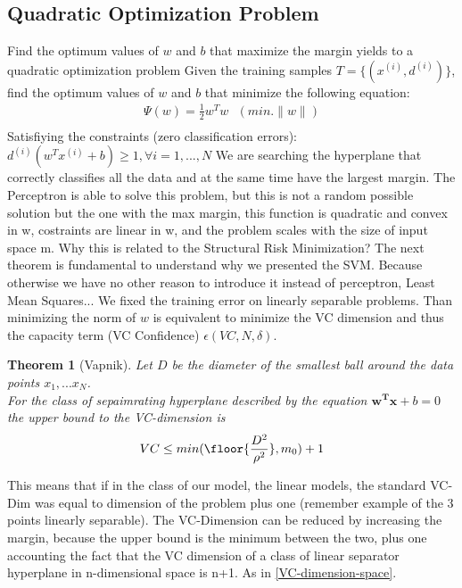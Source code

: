 \documentclass[12pt]{book}
\newtheorem{theorem}{Theorem}
\begin{document}
\subsection{Quadratic Optimization Problem}
Find the optimum values of $w$ and $b$ that maximize the margin yields to a quadratic optimization problem\newline
Given the training samples $T = \{(x^{(i)}, d^{(i)})\}$, find the optimum values of $w$ and $b$ that minimize the following equation:
\begin{equation}
\begin{aligned}
	\Psi(w)=\frac{1}{2}w^Tw \ \ \  (min.\|w\|) \\
\end{aligned}
\end{equation}
Satisfiying the constraints (zero classification errors): $d^{(i)}(w^Tx^{(i)} + b) \geq 1, \forall i = 1,...,N$
\newline\newline
We are searching the hyperplane that correctly classifies all the data and at the same time have the largest margin. The Perceptron is able to solve this problem, but this is not a random possible solution but the one with the max margin, this function is quadratic and convex in w, costraints are linear in w, and the problem scales with the size of input space m. 
\newline\newline
Why this is related to the Structural Risk Minimization?
The next theorem is fundamental to understand why we presented the SVM. Because otherwise we have no other reason to introduce it instead of perceptron, Least Mean Squares...\newline
We fixed the training error on linearly separable problems. Than minimizing the norm of $w$ is equivalent to minimize the VC dimension and thus the capacity term (VC Confidence) $\epsilon(VC,N,\delta)$. 
\begin{theorem}[Vapnik]
	Let $D$ be the diameter of the smallest ball around the data points $x_1,...x_N$. \\
	For the class of sepaimrating hyperplane described by the equation $\mathbf{w^Tx} + b = 0$ the upper bound to the VC-dimension is \\
	\begin{equation}
		VC \leq min(\floor{\frac{D^2}{\rho^2}}, m_0)+1
	\end{equation}
\end{theorem}
This means that if in the class of our model, the linear models, the standard VC-Dim was equal to dimension of the problem plus one (remember example of the 3 points linearly separable). The VC-Dimension can be reduced by increasing the margin, because the upper bound is the minimum between the two, plus one accounting the fact that the VC dimension of a class of linear separator hyperplane in n-dimensional space is n+1. As in \ref{VC-dimension-space}.\newline
\end{document}
